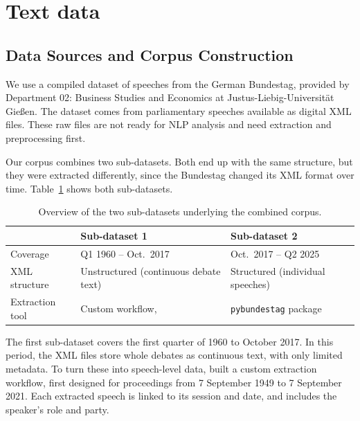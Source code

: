 \documentclass[12pt]{scrartcl}
\numberwithin{equation}{section}				%
\begin{document}
    
    
    \section{Text data}
    \label{sec:textdata}
    
    \subsection{Data Sources and Corpus Construction}
    
    We use a compiled dataset of speeches from the German Bundestag, provided by Department 02: Business Studies and Economics at Justus-Liebig-Universität Gießen. The dataset comes from parliamentary speeches available as digital \ac{XML} files. These raw files are not ready for \ac{NLP} analysis and need extraction and preprocessing first.
    
    Our corpus combines two sub-datasets. Both end up with the same structure, but they were extracted differently, since the Bundestag changed its \ac{XML} format over time. Table~\ref{tab:corpus-overview} shows both sub-datasets.
    
    \begin{table}[htbp]
    	\centering
    	\caption{Overview of the two sub-datasets underlying the combined corpus.}
    	\label{tab:corpus-overview}
    	\footnotesize
    	\begin{tabular}{lll}
    		\toprule
    		& \textbf{Sub-dataset 1} & \textbf{Sub-dataset 2} \\
    		\midrule
    		Coverage & Q1 1960 -- Oct.\ 2017 & Oct.\ 2017 -- Q2 2025 \\
    		\ac{XML} structure & Unstructured (continuous debate text) & Structured (individual speeches) \\
    		Extraction tool & Custom workflow, \textcite{latifi2024fiscal} & \texttt{pybundestag} package \\
    		\bottomrule
    	\end{tabular}
    \end{table}
    
    The first sub-dataset covers the first quarter of 1960 to October 2017. In this period, the \ac{XML} files store whole debates as continuous text, with only limited metadata. To turn these into speech-level data, \textcite{latifi2024fiscal} built a custom extraction workflow, first designed for proceedings from 7 September 1949 to 7 September 2021. Each extracted speech is linked to its session and date, and includes the speaker's role and party.
    
\end{document}
